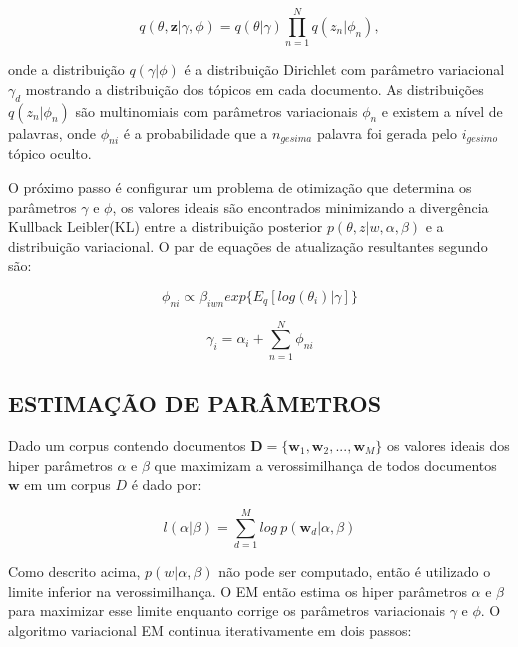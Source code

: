 \documentclass[12pt,a4paper]{article}
\begin{document}
  \begin{equation}
  q(\theta,\textbf{z}|\gamma,\phi)=q(\theta|\gamma)\prod_{n=1}^{N}q(z_n|\phi_n), 
  \end{equation}
  
  onde a distribuição  $q(\gamma|\phi)$ é a distribuição Dirichlet com parâmetro variacional $\gamma_d$ mostrando a distribuição dos tópicos em cada documento. As distribuições $q(z_n | \phi_n)$ são multinomiais com parâmetros variacionais $\phi_n$ e existem a nível de palavras, onde $\phi_{ni}$ é a probabilidade que a $n_{gesima}$ palavra foi gerada pelo $i_{gesimo}$ tópico oculto.
  
  O próximo passo é configurar um problema de otimização que determina os parâmetros $\gamma$ e $\phi$, os valores ideais são encontrados minimizando a divergência Kullback Leibler(KL) entre a distribuição posterior $p(\theta, z|w,\alpha,\beta)$ e a distribuição variacional. O par de equações de atualização resultantes segundo  são:
  
  \begin{equation}
  \phi_{ni} \propto \beta_{iwn} exp\{E_q[log(\theta_i)|\gamma]\}
  \end{equation}
  
  \begin{equation}
  \gamma_i = \alpha_i + \sum_{n=1}^{N} \phi_{ni}
  \end{equation}
  
  
  \subsection{ESTIMAÇÃO DE PARÂMETROS}
  Dado um corpus contendo documentos $\textbf{D} = \{\textbf{w}_1, \textbf{w}_2, . . ., \textbf{w}_M\}$ os valores ideais dos hiper parâmetros $\alpha$ e $\beta$ que maximizam a verossimilhança de todos documentos $\textbf{w}$ em um corpus $D$ é dado por:
  
  \begin{equation}
  l(\alpha|\beta) = \sum_{d=1}^{M} log\ p(\textbf{w}_d|\alpha,\beta)
  \end{equation}
  
  Como descrito acima, $p(w|\alpha,\beta)$ não pode ser computado, então é utilizado o limite inferior na verossimilhança. O EM então estima os hiper parâmetros $\alpha$ e $\beta$ para maximizar esse limite enquanto corrige os parâmetros variacionais $\gamma$ e $\phi$. O algoritmo variacional EM continua iterativamente em dois passos:
  
\end{document}
